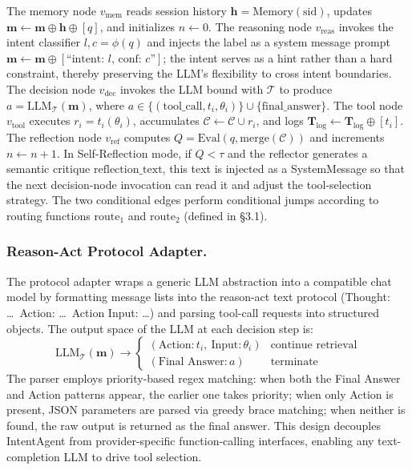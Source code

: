 \documentclass[runningheads]{llncs}
\begin{document}
The memory node $v_{\text{mem}}$ reads session history $\mathbf{h} = \text{Memory}(\text{sid})$, updates $\mathbf{m} \leftarrow \mathbf{m} \oplus \mathbf{h} \oplus [q]$, and initializes $n \leftarrow 0$. The reasoning node $v_{\text{reas}}$ invokes the intent classifier $l, c = \phi(q)$ and injects the label as a system message prompt $\mathbf{m} \leftarrow \mathbf{m} \oplus [\text{``intent: } l \text{, conf: } c\text{''}]$; the intent serves as a hint rather than a hard constraint, thereby preserving the LLM's flexibility to cross intent boundaries. The decision node $v_{\text{dec}}$ invokes the LLM bound with $\mathcal{T}$ to produce $a = \text{LLM}_{\mathcal{T}}(\mathbf{m})$, where $a \in \{(\text{tool\_call}, t_i, \theta_i)\} \cup \{\text{final\_answer}\}$. The tool node $v_{\text{tool}}$ executes $r_i = t_i(\theta_i)$, accumulates $\mathcal{C} \leftarrow \mathcal{C} \cup r_i$, and logs $\mathbf{T}_{\log} \leftarrow \mathbf{T}_{\log} \oplus [t_i]$. The reflection node $v_{\text{ref}}$ computes $Q = \text{Eval}(q, \text{merge}(\mathcal{C}))$ and increments $n \leftarrow n + 1$. In Self-Reflection mode, if $Q < \tau$ and the reflector generates a semantic critique $\text{reflection\_text}$, this text is injected as a SystemMessage so that the next decision-node invocation can read it and adjust the tool-selection strategy. The two conditional edges perform conditional jumps according to routing functions $\text{route}_1$ and $\text{route}_2$ (defined in \S3.1).

\subsubsection{Reason-Act Protocol Adapter.}

The protocol adapter wraps a generic LLM abstraction into a compatible chat model by formatting message lists into the reason-act text protocol (Thought: \ldots\ Action: \ldots\ Action Input: \ldots) and parsing tool-call requests into structured objects. The output space of the LLM at each decision step is:
\begin{equation}
    \text{LLM}_{\mathcal{T}}(\mathbf{m}) \to \begin{cases}
    (\text{Action}: t_i,\ \text{Input}: \theta_i) & \text{continue retrieval} \\
    (\text{Final Answer}: a) & \text{terminate}
    \end{cases}
\end{equation}
The parser employs priority-based regex matching: when both the Final Answer and Action patterns appear, the earlier one takes priority; when only Action is present, JSON parameters are parsed via greedy brace matching; when neither is found, the raw output is returned as the final answer. This design decouples IntentAgent from provider-specific function-calling interfaces, enabling any text-completion LLM to drive tool selection.
\end{document}
